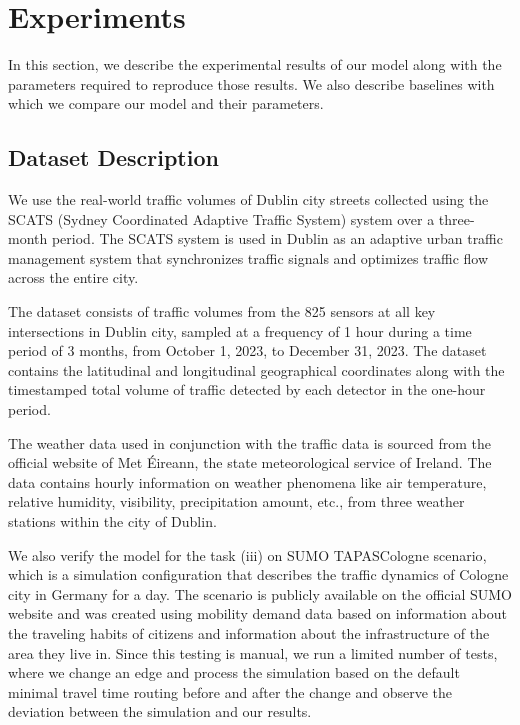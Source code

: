 \section{Experiments}\label{sec:experiments}

In this section, we describe the experimental results of our model along with the parameters required to reproduce those results. We also describe baselines with which we compare our model and their parameters.

\subsection{Dataset Description}

We use the real-world traffic volumes of Dublin city streets collected using the SCATS (Sydney Coordinated Adaptive Traffic System)\cite{scats} system over a three-month period. The SCATS system is used in Dublin as an adaptive urban traffic management system that synchronizes traffic signals and optimizes traffic flow across the entire city.

The dataset consists of traffic volumes from the 825 sensors at all key intersections in Dublin city, sampled at a frequency of 1 hour during a time period of 3 months, from October 1, 2023, to December 31, 2023. The dataset contains the latitudinal and longitudinal geographical coordinates along with the timestamped total volume of traffic detected by each detector in the one-hour period.

The weather data used in conjunction with the traffic data is sourced from the official website of Met Éireann\cite{met_historical_data}, the state meteorological service of Ireland. The data contains hourly information on weather phenomena like air temperature, relative humidity, visibility, precipitation amount, etc., from three weather stations within the city of Dublin.

We also verify the model for the task (iii) on SUMO\cite{sumo} TAPASCologne scenario\cite{tapas}, which is a simulation configuration that describes the traffic dynamics of Cologne city in Germany for a day. The scenario is publicly available on the official SUMO website and was created using mobility demand data based on information about the traveling habits of citizens and information about the infrastructure of the area they live in. Since this testing is manual, we run a limited number of tests, where we change an edge and process the simulation based on the default minimal travel time routing before and after the change and observe the deviation between the simulation and our results.

